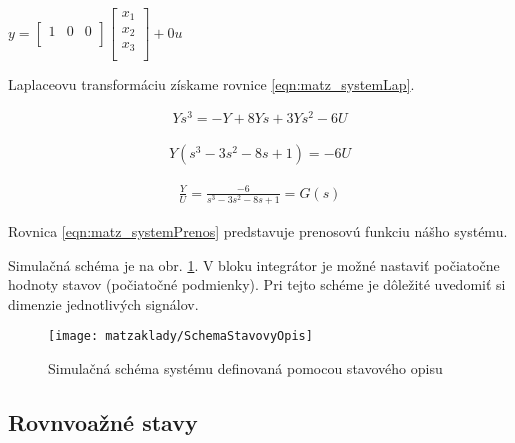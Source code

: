 \documentclass[../main.tex]{subfiles}
\begin{document}
        \begin{center}
		$y  = 
		\begin{bmatrix} 
			1 & 0 & 0 \\ 
		\end{bmatrix} 
		\begin{bmatrix} 
			x_1 \\ 
			x_2 \\ 
			x_3 \\ 
		\end{bmatrix} +
		0u $
	\label{eqn:matz_system2}
        \end{center}

Laplaceovu transformáciu získame rovnice \ref{eqn:matz_systemLap}. 

\begin{equation}
	\begin{split}
		Ys^3 = -Y + 8 Ys + 3Ys^2 - 6U
	\end{split}
	\label{eqn:matz_systemLap}
\end{equation}

\begin{equation}
	\begin{split}
		Y(s^3 -3s^2 -8s + 1) = - 6U
	\end{split}
\end{equation}

\begin{equation}
	\begin{split}
		\frac{Y}{U} = \frac{-6}{s^3 -3s^2 -8s + 1} = G(s)
	\end{split}
	\label{eqn:matz_systemPrenos}
\end{equation}

Rovnica  \ref{eqn:matz_systemPrenos} predstavuje prenosovú funkciu nášho systému.

Simulačná schéma je na obr. \ref{fig:matz_systemStavovyOpisSimulink}. V bloku integrátor je možné nastaviť počiatočne hodnoty stavov (počiatočné podmienky). Pri tejto schéme je dôležité uvedomiť si dimenzie jednotlivých signálov.

\begin{figure}[h!]
	\centering
	\texttt{[image: matzaklady/SchemaStavovyOpis]}
	\caption{Simulačná schéma systému definovaná pomocou stavového opisu}
	\label{fig:matz_systemStavovyOpisSimulink}
\end{figure}

\subsection{Rovnvoažné stavy}
	
\end{document}
